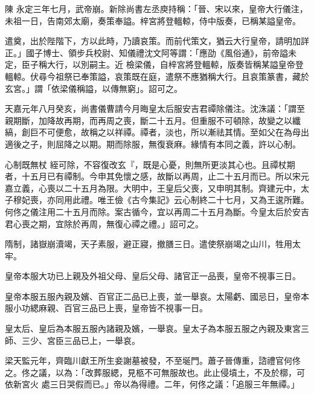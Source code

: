 
\begin{pinyinscope}

 陳
 永定三年七月，武帝崩。新除尚書左丞庾持稱：「晉、宋以來，皇帝大行儀注，未祖一日，告南郊太廟，奏策奉謚。梓宮將登轀輬，侍中版奏，已稱某謚皇帝。



 遣奠，出於陛階下，方以此時，乃讀哀策。而前代策文，猶云大行皇帝，請明加詳正。」國子博士、領步兵校尉、知儀禮沈文阿等謂：「應劭《風俗通》，前帝謚未定，臣子稱大行，以別嗣主。近
 檢梁儀，自梓宮將登轀輬，版奏皆稱某謚皇帝登轀輬。伏尋今祖祭已奉策謚，哀策既在庭，遣祭不應猶稱大行。且哀策篆書，藏於玄宮。」謂「依梁儀稱謚，以傳無窮」。詔可之。



 天嘉元年八月癸亥，尚書儀曹請今月晦皇太后服安吉君禫除儀注。沈洙議：「謂至親期斷，加降故再期，而再周之喪，斷二十五月。但重服不可頓除，故變之以纖縞，創巨不可便愈，故稱之以祥禫。禫者，淡也，所以漸祛其情。至如父在為母出適後之子，則屈降之以期。期而除服，無復衰麻。緣情有本同之義，許以心制。



 心制既無杖
 絰可除，不容復改玄『，既是心憂，則無所更淡其心也。且禫杖期者，十五月已有禫制。今申其免懷之感，故斷以再周，止二十五月而已。所以宋元嘉立義，心喪以二十五月為限。大明中，王皇后父喪，又申明其制。齊建元中，太子穆妃喪，亦同用此禮。唯王儉《古今集記》云心制終二十七月，又為王逡所難。何佟之儀注用二十五月而除。案古循今，宜以再周二十五月為斷。今皇太后於安吉君心喪之期，宜除於再周，無復心禫之禮。」詔可之。



 隋制，諸嶽崩瀆竭，天子素服，避正寢，撤膳三日。遣使祭崩竭之山川，牲用太牢。



 皇帝本服大功已上親及外祖父母、皇后父母、諸官正一品喪，皇帝不視事三日。



 皇帝本服五服內親及嬪、百官正二品已上喪，並一舉哀。太陽虧、國忌日，皇帝本服小功緦麻親、百官三品已上喪，皇帝皆不視事一日。



 皇太后、皇后為本服五服內諸親及嬪，一舉哀。皇太子為本服五服之內親及東宮三師、三少、宮臣三品已上，一舉哀。



 梁天監元年，齊臨川獻王所生妾謝墓被發，不至埏門。蕭子晉傳重，諮禮官何佟之。佟之議，以為：「改葬服緦，見柩不可無服故也。此止侵墳土，不及於槨，可依新宮火
 處三日哭假而已。」帝以為得禮。二年，何佟之議：「追服三年無禫。」




\end{pinyinscope}
